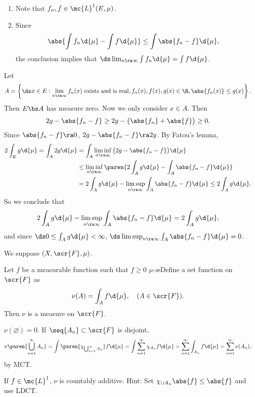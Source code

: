 \rmk
\begin{enumerate}
    \item Note that \(f_n, f \in \mc{L}^{1}(E, \mu)\).
    \item Since
          \[
              \abs{\int f_n \d{\mu} - \int f \d{\mu}} \leq \int \abs{f_n - f} \d{\mu},
          \] the conclusion implies that \(\ds \lim_{n \ra \infty} \int f_n \d{\mu} = \int f \d{\mu}\).
\end{enumerate}

\pf Let
\[
    A = \left\{\ds x \in E : \lim_{n \ra \infty} f_n(x) \text{ exists and is real}, f_n(x), f(x), g(x) \in \R, \abs{f_n(x)} \leq g(x)\right\}.
\]
Then \(E\bs A\) has measure zero. Now we only consider \(x \in A\). Then
\[
    2g - \abs{f_n - f} \geq 2g - \bigl(\abs{f_n} + \abs{f} \bigr) \geq 0.
\]
Since \(\abs{f_n - f} \ra 0\), \(2g - \abs{f_n - f} \ra 2g\). By Fatou's lemma,
\[
    \begin{aligned}
        2 \int_E g \d{\mu} = \int_A 2g \d{\mu} & = \int_A \liminf_{n \ra \infty} \big(2g - \abs{f_n - f}\big) \d{\mu}                               \\
                                               & \leq \liminf_{n \ra \infty} \paren{2 \int_A g \d{\mu} - \int_A \abs{f_n - f} \d{\mu}}              \\
                                               & = 2\int_A g \d{\mu} - \limsup_{n \ra \infty} \int_A \abs{f_n - f} \d{\mu} \leq 2 \int_A g \d{\mu}.
    \end{aligned}
\]
So we conclude that
\[
    2 \int_A g \d{\mu} - \limsup_{n \ra \infty} \int_A \abs{f_n - f} \d{\mu} = 2 \int_A g \d{\mu},
\]
and since \(\ds 0 \leq \int_A g \d{\mu} < \infty\), \(\ds \limsup_{n \ra \infty} \int_A \abs{f_n - f} \d{\mu} = 0\).

\bigskip

We suppose \((X, \scr{F}, \mu)\).

 Let \(f\) be a measurable function such that \(f \geq 0\) \(\mu\)-\ae Define a set function on \(\scr{F}\) as
\[
    \nu(A) = \int_A f \d{\mu}, \quad (A \in \scr{F}).
\]
Then \(\nu\) is a measure on \(\scr{F}\).

\pf \(\nu(\varnothing) = 0\). If \(\seq{A_n} \subset \scr{F}\) is disjoint,
\[
    \nu\paren{\bigcup_{n=1}^{\infty} A_n} = \int \paren{\chi_{\bigcup_{n=1}^{\infty} A_n}} f \d{\mu} = \int \sum_{n=1}^{\infty} \chi_{A_n} f \d{\mu} = \sum_{n=1}^{\infty} \int_{A_n} f \d{\mu} = \sum_{n=1}^{\infty} \nu(A_n),
\]
by MCT.

\rmk If \(f \in \mc{L}^{1}\), \(\nu\) is countably additive. Hint: Set \(\chi_{\cup A_n} \abs{f} \leq \abs{f}\) and use LDCT.

